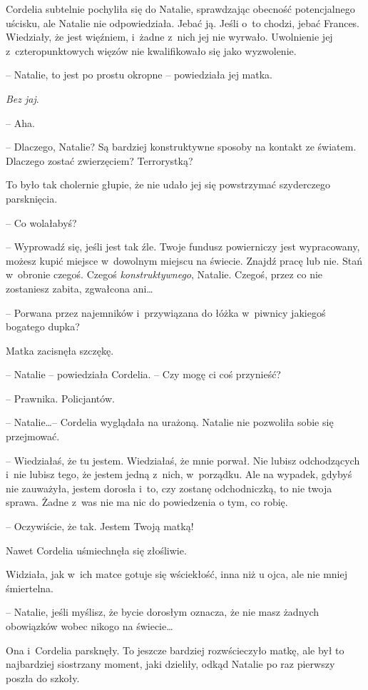 \documentclass[oneside,polish,11pt,sfheadings]{mwbk}
\begin{document}
Cordelia subtelnie pochyliła się do Natalie, sprawdzając obecność
potencjalnego uścisku, ale Natalie nie odpowiedziała. Jebać ją. Jeśli o~to chodzi, jebać Frances. Wiedziały, że jest więźniem, i~żadne z~nich
jej nie wyrwało. Uwolnienie jej z~czteropunktowych więzów nie
kwalifikowało się jako wyzwolenie.

-- Natalie, to jest po prostu okropne -- powiedziała jej matka.

\textit{Bez jaj}. 

-- Aha.

-- Dlaczego, Natalie? Są bardziej konstruktywne sposoby na kontakt ze
światem. Dlaczego zostać zwierzęciem? Terrorystką?

To było tak cholernie głupie, że nie udało jej się powstrzymać
szyderczego parsknięcia. 

-- Co wolałabyś?

-- Wyprowadź się, jeśli jest tak źle. Twoje fundusz powierniczy jest
wypracowany, możesz kupić miejsce w~dowolnym miejscu na świecie. Znajdź
pracę lub nie. Stań w~obronie czegoś. Czegoś \textit{konstruktywnego},
Natalie. Czegoś, przez co nie zostaniesz zabita, zgwałcona ani\ldots 

-- Porwana przez najemników i~przywiązana do łóżka w~piwnicy jakiegoś
bogatego dupka?

Matka zacisnęła szczękę.

-- Natalie -- powiedziała Cordelia. -- Czy mogę ci coś przynieść?

-- Prawnika. Policjantów.

-- Natalie\ldots  -- Cordelia wyglądała na urażoną. Natalie nie pozwoliła
sobie się przejmować.

-- Wiedziałaś, że tu jestem. Wiedziałaś, że mnie porwał. Nie lubisz
odchodzących i~nie lubisz tego, że jestem jedną z~nich, w~porządku. Ale
na wypadek, gdybyś nie zauważyła, jestem dorosła i~to, czy zostanę
odchodniczką, to nie twoja sprawa. Żadne z~was nie ma nic do powiedzenia
o tym, co robię.

-- Oczywiście, że tak. Jestem Twoją matką!

Nawet Cordelia uśmiechnęła się złośliwie.

Widziała, jak w~ich matce gotuje się wściekłość, inna niż u ojca, ale
nie mniej śmiertelna. 

-- Natalie, jeśli myślisz, że bycie dorosłym
oznacza, że nie masz żadnych obowiązków wobec nikogo na świecie\ldots 

Ona i~Cordelia parsknęły. To jeszcze bardziej rozwścieczyło matkę, ale
był to najbardziej siostrzany moment, jaki dzieliły, odkąd Natalie po
raz pierwszy poszła do szkoły.
\end{document}

